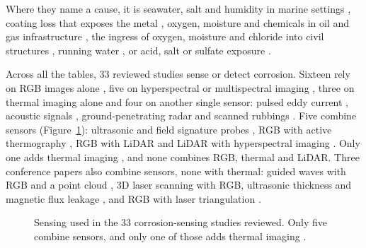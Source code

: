 Where they name a cause, it is seawater, salt and humidity in marine settings
\citep{Hernndez-Surez2026,Arias2025,Fu2024,Imran2025,PallasEnguita2025}, coating
loss that exposes the metal \citep{Hu2023}, oxygen, moisture and chemicals in oil
and gas infrastructure \citep{Alvani2026}, the ingress of oxygen, moisture and
chloride into civil structures \citep{Bui2026}, running water \citep{Savino2025},
or acid, salt or sulfate exposure \citep{Lavadiya2022}.

Across all the tables, 33 reviewed studies sense or detect corrosion. Sixteen
rely on RGB images alone
\citep{Malashin2024,Mao2026,Espinoza2026,Fu2024,Alvani2026,Imran2025,Yao2019,Nash2022,Savino2025,Maharjan2025,Li2024b,Suzuki2026,Rahman2021,Hu2023,Yu2023,HerndonTien2025},
five on hyperspectral or multispectral imaging
\citep{Egodawela2025,DeKerf2022,Arias2025,Lavadiya2022,Hernndez-Surez2026}, three
on thermal imaging alone \citep{Elizalde2023,Doshvarpassand2022,Liu2021} and four
on another single sensor: pulsed eddy current \citep{Yang2025}, acoustic signals
\citep{Yang2026a}, ground-penetrating radar \citep{Bui2026} and scanned rubbings
\citep{Khodabux2021a}. Five combine sensors (Figure~\ref{fig:corr-sensing}):
ultrasonic and field signature probes \citep{Huang2026a}, RGB with active
thermography \citep{Lim2021}, RGB with LiDAR
\citep{Maru2025,PimenteldeFigueiredo2025} and LiDAR with hyperspectral imaging
\citep{PallasEnguita2025}. Only one adds thermal imaging \citep{Lim2021}, and none
combines RGB, thermal and LiDAR. Three conference papers also combine sensors,
none with thermal: guided waves with RGB and a point cloud \citep{Ding2025}, 3D
laser scanning with RGB, ultrasonic thickness and magnetic flux leakage
\citep{Zheng2025}, and RGB with laser triangulation \citep{Haitz2022}.


\begin{figure}[htbp]
\centering
{}
\caption[Sensing used in the reviewed corrosion studies]{Sensing used in the 33 corrosion-sensing studies reviewed. Only five
combine sensors, and only one of those adds thermal imaging \citep{Lim2021}.}
\label{fig:corr-sensing}
\end{figure}

